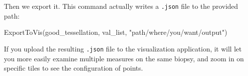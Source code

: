 \documentclass[
]{book}
\newenvironment{Shaded}{\begin{snugshade}}{\end{snugshade}}
\newcommand{\FunctionTok}[1]{\textcolor[rgb]{0.00,0.00,0.00}{#1}}
\newcommand{\NormalTok}[1]{#1}
\newcommand{\StringTok}[1]{\textcolor[rgb]{0.31,0.60,0.02}{#1}}
\begin{document}
Then we export it. This command actually writes a \texttt{.json} file to the provided path:

\begin{Shaded}
\begin{Highlighting}[]
\FunctionTok{ExportToVis}\NormalTok{(good\_tessellation, val\_list, }\StringTok{"path/where/you/want/output"}\NormalTok{)}
\end{Highlighting}
\end{Shaded}

If you upload the resulting \texttt{.json} file to the visualization application, it will let you more easily examine multiple measures on the same biopsy, and zoom in on specific tiles to see the configuration of points.

  
\end{document}
